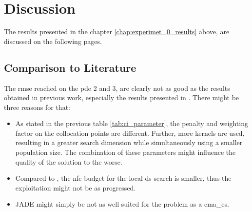 \documentclass[./\jobname.tex]{subfiles}
\begin{document}
\begin{figure}[H]
	\centering
	\noindent{}
	\label{fig:serial_jade_memory_boxplot}
\end{figure}

\section{Discussion}

The results presented in the chapter \ref{chap:experimet_0_results} above, are discussed on the following pages. 

\subsection{Comparison to Literature}

The \gls{rmse} reached on the \gls{pde} 2 and 3, are clearly not as good as the results obtained in previous work, especially the results presented in \cite{chaquet_using_2019}. There might be three reasons for that: 
\begin{itemize}
	\item As stated in the previous table \ref{tab:ci_parameter}, the penalty and weighting factor on the collocation points are different. Further, more kernels are used, resulting in a greater search dimension while simultaneously using a smaller population size. The combination of these parameters might influence the quality of the solution to the worse. 
	\item Compared to \cite{chaquet_using_2019}, the \gls{nfe}-budget for the local \gls{ds} search is smaller, thus the exploitation might not be as progressed.
	\item JADE might simply be not as well suited for the problem as a \gls{cma_es}. 
\end{itemize}
\end{document}

